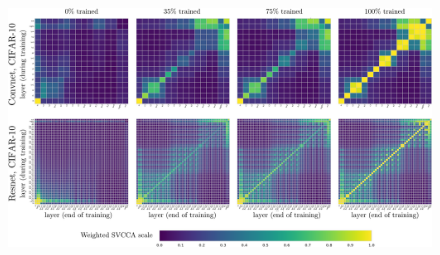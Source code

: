 \documentclass{article} %
\begin{document}
\begin{figure}[ht]
  \centering
  \includegraphics[width=1.0\columnwidth]{figures_nips/dynamics/dynamics_plots_crop.pdf}



\end{figure}
\end{document}
